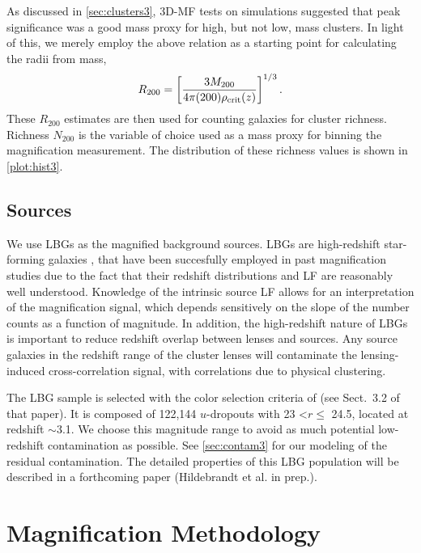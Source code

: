 As discussed in \autoref{sec:clusters3}, \ac{3D-MF} tests on simulations suggested that peak significance was a good mass proxy for high, but not low, mass clusters. In light of this, we merely employ the above relation as a starting point for calculating the radii from mass,
\begin{equation}
R_{200} = \left[ \frac{3 M_{200}}{4 \pi (200) \rho_{\rm crit}(z)} \right] ^ {1/3}.
\end{equation}
These $R_{200}$ estimates are then used for counting galaxies for cluster richness. Richness $N_{200}$ is the variable of choice used as a mass proxy for binning the magnification measurement. The distribution of these richness values is shown in \autoref{plot:hist3}.


\subsection{Sources}
We use \ac{LBG}s as the magnified background sources. \ac{LBG}s are high-redshift star-forming galaxies \citep{Steidel98}, that have been succesfully employed in past magnification studies \citep[see][]{Hildebrandt09b, Hildebrandt11, Morrison12, Ford12} due to the fact that their redshift distributions and \ac{LF} are reasonably well understood. Knowledge of the intrinsic source \ac{LF} allows for an interpretation of the magnification signal, which depends sensitively on the slope of the number counts as a function of magnitude. In addition, the high-redshift nature of \ac{LBG}s is important to reduce redshift overlap between lenses and sources. Any source galaxies in the redshift range of the cluster lenses will contaminate the lensing-induced cross-correlation signal, with correlations due to physical clustering.

The \ac{LBG} sample is selected with the color selection criteria of \citet{Hildebrandt09a} (see Sect.~3.2 of that paper). It is composed of 122,144 $u$-dropouts with 23 \textless $r \leq$ 24.5, located at redshift $\sim$3.1. We choose this magnitude range to avoid as much potential low-redshift contamination as possible. See \autoref{sec:contam3} for our modeling of the residual contamination. The detailed properties of this \ac{LBG} population will be described in a forthcoming paper (Hildebrandt et al. in prep.).


\section{Magnification Methodology}
\label{sec:method3}

